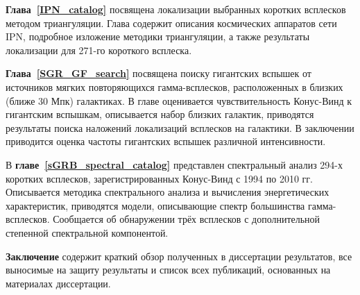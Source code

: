 \textbf{Глава~\ref{IPN_catalog}} посвящена локализации выбранных коротких всплесков 
методом триангуляции. Глава содержит описания космических аппаратов сети IPN, 
подробное изложение методики триангуляции, а также результаты локализации для 
271-го короткого всплеска.  

\textbf{Глава~\ref{SGR_GF_search}} посвящена поиску гигантских вспышек от источников
мягких повторяющихся гамма-всплесков, расположенных в близких (ближе 30 Мпк) галактиках.
В главе оценивается чувствительность Конус-Винд к гигантским вспышкам, 
описывается набор близких галактик, приводятся результаты поиска наложений локализаций
всплесков на галактики. В заключении приводится оценка частоты гигантских вспышек различной 
интенсивности.

В \textbf{главе~\ref{sGRB_spectral_catalog}} представлен спектральный анализ 294-х
коротких всплесков, зарегистрированных Конус-Винд с 1994 по 2010 гг. 
Описывается методика спектрального анализа и вычисления энергетических характеристик,
приводятся модели, описывающие спектр большинства гамма-всплесков.
Сообщается об обнаружении трёх всплесков с дополнительной степенной спектральной
компонентой. 

\textbf{Заключение} содержит краткий обзор полученных в диссертации результатов, 
все выносимые на защиту результаты и список всех публикаций, 
основанных на материалах диссертации.

\clearpage